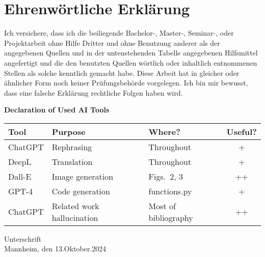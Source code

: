 \documentclass[a4paper,oneside,bibliography=totoc]{scrbook}
\begin{document}
\backmatter

\chapter{Ehrenwörtliche Erklärung}
Ich versichere, dass ich die beiliegende Bachelor-, Master-, Seminar-, oder
Projektarbeit ohne Hilfe Dritter und ohne Benutzung anderer als der angegebenen
Quellen und in der untenstehenden Tabelle angegebenen Hilfsmittel angefertigt
und die den benutzten Quellen wörtlich oder inhaltlich entnommenen Stellen als
solche kenntlich gemacht habe. Diese Arbeit hat in gleicher oder ähnlicher Form
noch keiner Prüfungsbehörde vorgelegen. Ich bin mir bewusst, dass eine falsche
Erklärung rechtliche Folgen haben wird.

\begin{center}
    \textbf{Declaration of Used AI Tools} \\[.3em]
    \begin{tabularx}{\textwidth}{lXlc}
        \toprule
        Tool        & Purpose                       & Where?                        & Useful? \\
        \midrule
        ChatGPT     & Rephrasing                    & Throughout                    & +       \\
        DeepL       & Translation                   & Throughout                    & +       \\
        Dall-E      & Image generation              & Figs.~2, 3                    & ++      \\
        GPT-4       & Code generation               & functions.py                  & +       \\
        ChatGPT     & Related work hallucination    & Most of bibliography          & ++      \\
        \bottomrule
    \end{tabularx}
\end{center}
\vspace{2cm}
\noindent Unterschrift\\
\noindent Mannheim, den 13.Oktober.2024 \hfill
\end{document}
